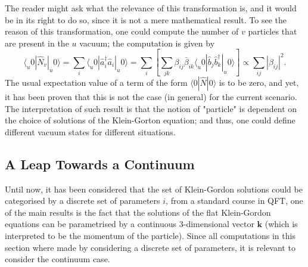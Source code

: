 The reader might ask what the relevance of this transformation is, and it would be in its right to do so, since it is not a mere mathematical result. To see the reason of this transformation, one could compute the number of $v$ particles that are present in the $u$ vacuum; the computation is given by
\begin{equation}\label{eq: Bogoliubov Number particles general}
	\langle_u0|\hat{N}_v|_u0\rangle=\sum_i\langle_u0|\hat{a}_i^\dagger\hat{a}_i|_u0\rangle=\sum_{i}\left[\sum_{jk}\beta_{ij}\bar \beta_{ik}\langle_u0|\hat{b}_j\hat{b}_k^\dagger|_u0\rangle\right]\propto \sum_{ij}|\beta_{ij}|^2.
\end{equation}
The usual expectation value of a term of the form $\langle0|\hat{N}|0\rangle$ is to be zero, and yet, it has been proven that this is not the case (in general) for the current scenario. The interpretation of such result is that the notion of "particle" is dependent on the choice of solutions of the Klein-Gorton equation; and thus, one could define different vacuum states for different situations.

\subsection{A Leap Towards a Continuum}
Until now, it has been considered that the set of Klein-Gordon solutions could be categorised by a discrete set of parameters $i$, from a standard course in QFT, one of the main results is the fact that the solutions of the flat Klein-Gordon equations can be parametrised by a continuous $3$-dimensional vector $\mathbf{k}$ (which is interpreted to be the momentum of the particle). Since all computations in this section where made by considering a discrete set of parameters, it is relevant to consider the continuum case.

